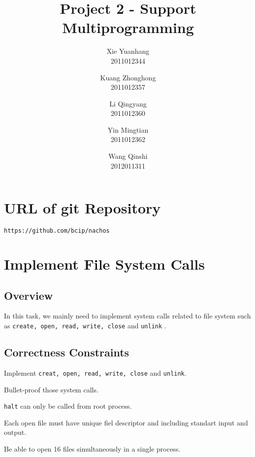 \documentclass{article}
\title{Project 2 - Support Multiprogramming}
\author{
Xie Yuanhang  \\   2011012344\and
Kuang Zhonghong  \\   2011012357\and
Li Qingyang   \\   2011012360 \and
Yin Mingtian   \\   2011012362\and
Wang Qinshi   \\   2012011311}
\date{}
\begin{document}
\maketitle
\tableofcontents{}
\section{URL of git Repository}
\texttt{https://github.com/bcip/nachos}
\section{Implement File System Calls}
\subsection{Overview}
In this task, we mainly need to implement system calls related to file system such as \texttt{create, open, read, write, close} and \texttt{unlink}
.
\subsection{Correctness Constraints}
\begin{compactitem}
\item Implement \texttt{creat, open, read, write, close} and \texttt{unlink}.
\item Bullet-proof those system calls.
\item \texttt{halt} can only be called from root process.
\item Each open file must have unique fiel descriptor and including standart input and output.
\item Be able to open 16 files simultaneously in a single process.
\end{compactitem}
\end{document}
